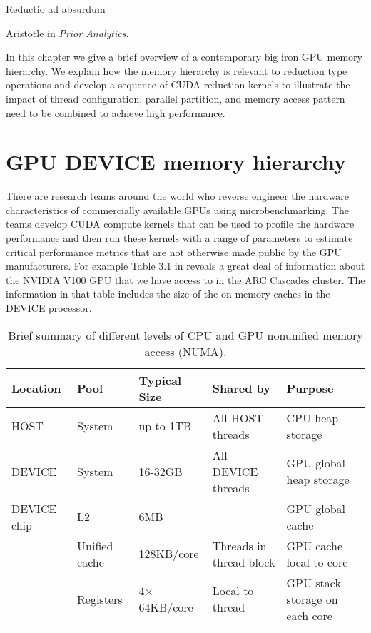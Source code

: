 \epigraph{Reductio ad absurdum}{Aristotle in \emph{Prior Analytics}.}


\minitoc

In this chapter we give a brief overview of a contemporary big iron GPU memory hierarchy. We explain how the memory hierarchy is relevant to reduction type operations and develop a sequence of CUDA reduction kernels to illustrate the impact of thread configuration, parallel partition, and memory access pattern need to be combined to achieve high performance.

\section{GPU DEVICE memory hierarchy}

There are research teams around the world who reverse engineer the hardware characteristics of commercially available GPUs using microbenchmarking. The teams develop CUDA compute kernels that can be used to profile the hardware performance and then run these kernels with a range of parameters to estimate critical performance metrics that are not otherwise made public by the GPU manufacturers. For example Table 3.1 in  \cite{jia2018dissecting} reveals a great deal of information about the NVIDIA V100 GPU that we have access to in the ARC Cascades cluster. The information in that table includes the size of the on memory caches in the DEVICE processor.

\begin{table}[htbp!]
    \centering
    \begin{tabular}{l|l||l|l|l} \hline
   Location &  Pool    & Typical Size & Shared by      & Purpose \\ \hline
   HOST     & System  & up to 1TB    & All HOST threads   & CPU heap storage \\  \hline
   DEVICE   & System  & 16-32GB      & All DEVICE threads & GPU global heap storage \\
   DEVICE chip & L2      & 6MB          &                    & GPU global cache     \\
            & Unified cache  & 128KB/core & Threads in thread-block & GPU cache local to core \\
            & Registers  & 4$\times$64KB/core & Local to thread   & GPU stack storage on each core \\ \hline
    \end{tabular}
    \caption{Brief summary of different levels of CPU and GPU nonunified memory access (NUMA). }
    \label{gpuMemory.tab}
\end{table}

